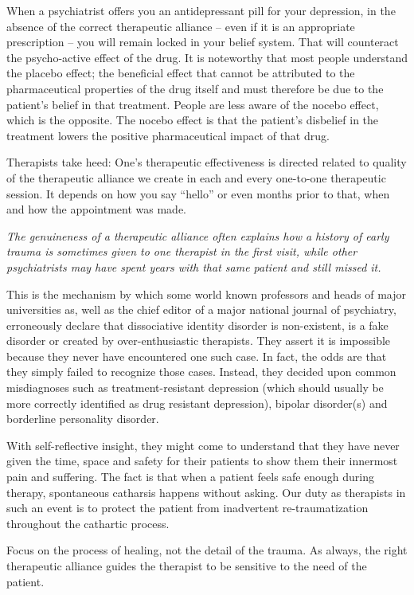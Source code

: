 \documentclass[]{book}
\begin{document}
When a psychiatrist offers you an antidepressant pill for your depression, in the absence of the correct therapeutic alliance -- even if it is an appropriate prescription -- you will remain locked in your belief system. That will counteract the psycho-active effect of the drug. It is noteworthy that most people understand the placebo effect; the beneficial effect that cannot be attributed to the pharmaceutical properties of the drug itself and must therefore be due to the patient's belief in that treatment. People are less aware of the nocebo effect, which is the opposite. The nocebo effect is that the patient's disbelief in the treatment lowers the positive pharmaceutical impact of that drug.

Therapists take heed: One's therapeutic effectiveness is directed related to quality of the therapeutic alliance we create in each and every one-to-one therapeutic session. It depends on how you say ``hello'' or even months prior to that, when and how the appointment was made.

\emph{The genuineness of a therapeutic alliance often explains how a history of early trauma is sometimes given to one therapist in the first visit, while other psychiatrists may have spent years with that same patient and still missed it.}

This is the mechanism by which some world known professors and heads of major universities as, well as the chief editor of a major national journal of psychiatry, erroneously declare that dissociative identity disorder is non-existent, is a fake disorder or created by over-enthusiastic therapists. They assert it is impossible because they never have encountered one such case. In fact, the odds are that they simply failed to recognize those cases. Instead, they decided upon common misdiagnoses such as treatment-resistant depression (which should usually be more correctly identified as drug resistant depression), bipolar disorder(s) and borderline personality disorder.

With self-reflective insight, they might come to understand that they have never given the time, space and safety for their patients to show them their innermost pain and suffering. The fact is that when a patient feels safe enough during therapy, spontaneous catharsis happens without asking. Our duty as therapists in such an event is to protect the patient from inadvertent re-traumatization throughout the cathartic process.

Focus on the process of healing, not the detail of the trauma. As always, the right therapeutic alliance guides the therapist to be sensitive to the need of the patient.
\end{document}
